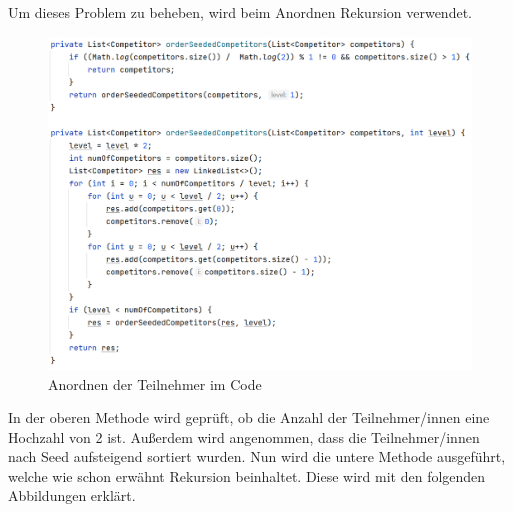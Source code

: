 Um dieses Problem zu beheben, wird beim Anordnen Rekursion verwendet.

\begin{figure}[H]
    \includegraphics[scale=0.5]{pics/backend/elimination/elimination_orderSeededCompetitors.png}
    \caption{Anordnen der Teilnehmer im Code}
\end{figure}

In der oberen Methode wird geprüft, ob die Anzahl der Teilnehmer/innen eine Hochzahl von 2 ist.
Außerdem wird angenommen, dass die Teilnehmer/innen nach Seed aufsteigend sortiert wurden. Nun wird die untere Methode ausgeführt, 
welche wie schon erwähnt Rekursion beinhaltet. Diese wird mit den folgenden Abbildungen erklärt.

